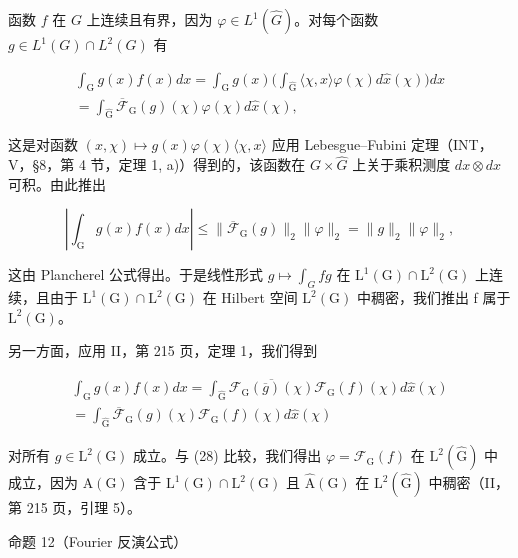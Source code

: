 函数 \(f\) 在 \(G\) 上连续且有界，因为 \(\varphi \in L^{1}(\widehat{G})\)。对每个函数 \(g \in L^{1}(G) \cap L^{2}(G)\) 有

\[
\begin{array}{r} \int_ {\mathrm{G}} g (x) f (x) d x = \int_ {\mathrm{G}} g (x) \Big (\int_ {\widehat {\mathrm{G}}} \langle \chi , x \rangle \varphi (\chi) d \widehat {x} (\chi) \Big) d x \\ = \int_ {\widehat {\mathrm{G}}} \overline {{\mathcal {F}}} _ {\mathrm{G}} (g) (\chi) \varphi (\chi) d \widehat {x} (\chi), \end{array}\tag{28}
\]

这是对函数 \((x,\chi)\mapsto g(x)\varphi(\chi)\langle\chi,x\rangle\) 应用 Lebesgue–Fubini 定理（INT，V，§8，第 4 节，定理 1, a)）得到的，该函数在 \(G\times\widehat{G}\) 上关于乘积测度 \(dx\otimes d\widehat{x}\) 可积。由此推出

\[
\left| \int_ {\mathrm{G}} g (x) f (x) d x \right| \leqslant \| \overline {{{\mathcal {F}}}} _ {\mathrm{G}} (g) \| _ {2} \| \varphi \| _ {2} = \| g \| _ {2} \| \varphi \| _ {2},
\]

这由 Plancherel 公式得出。于是线性形式 \(g \mapsto \int_{G} fg\) 在 \(\mathrm{L}^{1}(\mathrm{G}) \cap \mathrm{L}^{2}(\mathrm{G})\) 上连续，且由于 \(\mathrm{L}^{1}(\mathrm{G}) \cap \mathrm{L}^{2}(\mathrm{G})\) 在 Hilbert 空间 \(\mathrm{L}^{2}(\mathrm{G})\) 中稠密，我们推出 f 属于 \(\mathrm{L}^{2}(\mathrm{G})\)。

另一方面，应用 II，第 215 页，定理 1，我们得到

\[
\begin{array}{r} \int_ {\mathrm{G}} g (x) f (x) d x = \int_ {\widehat {\mathrm{G}}} \overline {{\mathcal {F} _ {\mathrm{G}} (\overline {{g}}) (\chi)}} \mathcal {F} _ {\mathrm{G}} (f) (\chi) d \widehat {x} (\chi) \\ = \int_ {\widehat {\mathrm{G}}} \overline {{\mathcal {F}}} _ {\mathrm{G}} (g) (\chi) \mathcal {F} _ {\mathrm{G}} (f) (\chi) d \widehat {x} (\chi) \end{array}
\]

对所有 \(g \in \mathrm{L}^{2}(\mathrm{G})\) 成立。与 (28) 比较，我们得出 \(\varphi = \mathcal{F}_{\mathrm{G}}(f)\) 在 \(\mathrm{L}^{2}(\widehat{\mathrm{G}})\) 中成立，因为 \(\mathrm{A}(\mathrm{G})\) 含于 \(\mathrm{L}^{1}(\mathrm{G}) \cap \mathrm{L}^{2}(\mathrm{G})\) 且 \(\widehat{\mathrm{A}}(\mathrm{G})\) 在 \(\mathrm{L}^{2}(\widehat{\mathrm{G}})\) 中稠密（II，第 215 页，引理 5）。

命题 12（Fourier 反演公式）

